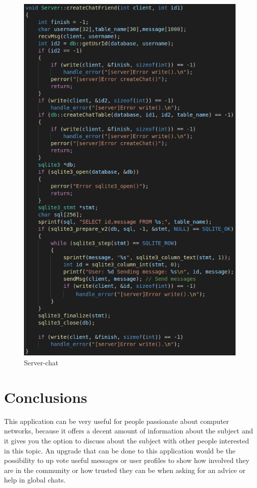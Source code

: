 \documentclass[runningheads]{llncs}
\begin{document}
\begin{figure}[H]
\begin{center}
\includegraphics[]{images/server-chat.png}
\caption{Server-chat}
\end{center}
\end{figure}



\section{Conclusions}

This application can be very useful for people passionate about computer networks, because it offers a decent amount of information about the subject and it gives you the option to discuss about the subject with other people interested in this topic. An upgrade that can be done to this application would be the possibility to up vote useful messages or user profiles to show how involved they are in the community or how trusted they can be when asking for an advice or help in global chats. 


\end{document}
